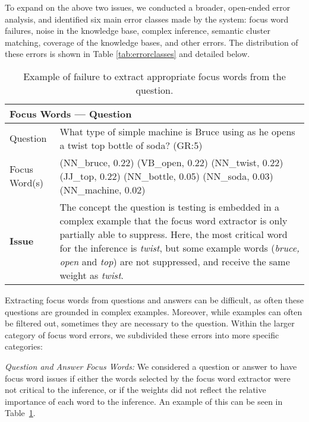 To expand on the above two issues, we conducted a broader, open-ended error analysis, and identified six main error classes made by the system: focus word failures, noise in the knowledge base, complex inference, semantic cluster matching, coverage of the knowledge bases, and other errors.  The distribution of these errors is shown in Table \ref{tab:errorclasses} and detailed below.

 
\begin{table}[]
\begin{footnotesize}
\begin{tabularx}{\textwidth}{p{2.5cm}p{10cm}}
\hline
\multicolumn{2}{l}{Focus Words --- Question} \\
\hline
Question 		& What type of simple machine is Bruce using as he opens a twist top bottle of soda? (GR:5) \\
Focus Word(s) 	& (NN\_bruce, 0.22) (VB\_open, 0.22) (NN\_twist, 0.22) (JJ\_top, 0.22) (NN\_bottle, 0.05) (NN\_soda, 0.03) (NN\_machine, 0.02)		     \\
\textbf{Issue}	& The concept the question is testing is embedded in a complex example that the focus word extractor is only partially able to suppress. Here, the most critical word for the inference is \emph{twist}, but some example words (\emph{bruce, open} and \emph{top}) are not suppressed, and receive the same weight as \emph{twist}. \\
\hline
\end{tabularx}
\end{footnotesize}
\caption{{  Example of failure to extract appropriate focus words from the question. }} 
\label{ex:majorfw}
\end{table}


{}
Extracting focus words from questions and answers can be difficult, as often these questions are grounded in complex examples.  Moreover, while examples can often be filtered out, sometimes they are necessary to the question. Within the larger category of focus word errors, we subdivided these errors into more specific categories: 

{\flushleft \emph{Question and Answer Focus Words: }}
We considered a question or answer to have focus word issues if either the words selected by the focus word extractor were not critical to the inference, or if the weights did not reflect the relative importance of each word to the inference.  An example of this can be seen in Table~\ref{ex:majorfw}.

